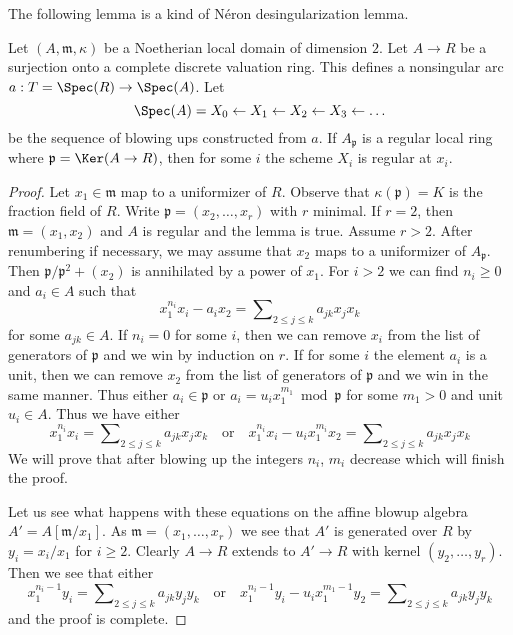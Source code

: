 \noindent
The following lemma is a kind of N\'eron desingularization lemma.

\begin{lemma}
\label{lemma-sequence-blowups-along-arc-becomes-nonsingular}
Let $(A, \mathfrak m, \kappa)$ be a Noetherian local domain of
dimension $2$. Let $A \to R$ be a surjection onto a
complete discrete valuation ring.
This defines a nonsingular arc $a : T = \Spec(R) \to \Spec(A)$. Let
$$
\Spec(A) = X_0 \leftarrow X_1 \leftarrow X_2 \leftarrow X_3 \leftarrow \ldots
$$
be the sequence of blowing ups constructed from $a$.
If $A_\mathfrak p$ is a regular local ring where
$\mathfrak p = \Ker(A \to R)$, then
for some $i$ the scheme $X_i$ is regular at $x_i$.
\end{lemma}

\begin{proof}
Let $x_1 \in \mathfrak m$ map to a uniformizer of $R$.
Observe that $\kappa(\mathfrak p) = K$ is the
fraction field of $R$. Write $\mathfrak p = (x_2, \ldots, x_r)$
with $r$ minimal. If $r = 2$, then $\mathfrak m = (x_1, x_2)$
and $A$ is regular and the lemma is true. Assume $r > 2$.
After renumbering if necessary,
we may assume that $x_2$ maps to a uniformizer of $A_\mathfrak p$.
Then $\mathfrak p/\mathfrak p^2 + (x_2)$ is annihilated by a power
of $x_1$. For $i > 2$ we can find $n_i \geq 0$ and $a_i \in A$
such that
$$
x_1^{n_i} x_i - a_i x_2 = \sum\nolimits_{2 \leq j \leq k} a_{jk} x_jx_k
$$
for some $a_{jk} \in A$. If $n_i = 0$ for some $i$, then we can remove
$x_i$ from the list of generators of $\mathfrak p$ and we win by
induction on $r$. If for some $i$ the element $a_i$ is a unit, then
we can remove $x_2$ from the list of generators of $\mathfrak p$
and we win in the same manner. Thus either
$a_i \in \mathfrak p$ or $a_i = u_i x_1^{m_1} \bmod \mathfrak p$
for some $m_1 > 0$ and unit $u_i \in A$. Thus we have either
$$
x_1^{n_i} x_i = \sum\nolimits_{2 \leq j \leq k} a_{jk} x_jx_k
\quad\text{or}\quad
x_1^{n_i} x_i - u_i x_1^{m_i} x_2 =
\sum\nolimits_{2 \leq j \leq k} a_{jk} x_jx_k
$$
We will prove that after blowing up the integers $n_i$, $m_i$
decrease which will finish the proof.

\medskip\noindent
Let us see what happens with these equations on the affine blowup
algebra $A' = A[\mathfrak m/x_1]$. As $\mathfrak m = (x_1, \ldots, x_r)$
we see that $A'$ is generated over $R$ by $y_i = x_i/x_1$ for $i \geq 2$.
Clearly $A \to R$ extends to $A' \to R$ with kernel
$(y_2, \ldots, y_r)$. Then we see that either
$$
x_1^{n_i - 1} y_i = \sum\nolimits_{2 \leq j \leq k} a_{jk} y_jy_k
\quad\text{or}\quad
x_1^{n_i - 1} y_i - u_i x_1^{m_1 - 1} y_2 =
\sum\nolimits_{2 \leq j \leq k} a_{jk} y_jy_k
$$
and the proof is complete.
\end{proof}




